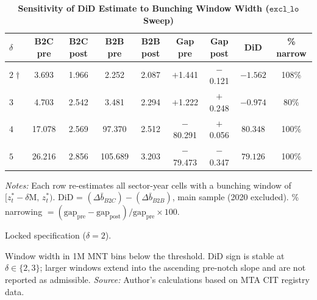 \documentclass[12pt,oneside,a4paper]{report}
\begin{document}
\begin{table}[H]
\centering
\caption{\textbf{Sensitivity of DiD Estimate to Bunching Window Width ($\texttt{excl\_lo}$ Sweep)}}
\label{tab:app_excl_lo}
\begin{threeparttable}
\setlength{\tabcolsep}{4pt} %
\small
\begin{tabular}{lcccccccc}
\toprule
$\delta$\tnote{a} & B2C pre & B2C post & B2B pre & B2B post
  & Gap pre & Gap post & DiD & \% narrow \\
\midrule
$2\dag$ & 3.693 & 1.966 & 2.252 & 2.087 & $+$1.441 & $-$0.121 & $-1.562$ & 108\% \\
$3$ & 4.703 & 2.542 & 3.481 & 2.294 & $+$1.222 & $+$0.248 & $-0.974$ & 80\% \\
$4$ & 17.078 & 2.569 & 97.370 & 2.512 & $-$80.291 & $+$0.056 & $80.348$ & 100\% \\
$5$ & 26.216 & 2.856 & 105.689 & 3.203 & $-$79.473 & $-$0.347 & $79.126$ & 100\% \\
\bottomrule
\end{tabular}
\begin{tablenotes}\footnotesize
\item \textit{Notes:} Each row re-estimates all sector-year cells with a bunching window of $[z^*_t - \delta\text{M},\, z^*_t)$. DiD = $(\Delta\bar{b}_{B2C}) - (\Delta\bar{b}_{B2B})$, main sample (2020 excluded). \% narrowing $= (\text{gap}_{\text{pre}} - \text{gap}_{\text{post}}) / \text{gap}_{\text{pre}} \times 100$.
\item[$\dag$] Locked specification ($\delta = 2$).
\item[a] Window width in 1M MNT bins below the threshold.
DiD sign is stable at $\delta \in \{2,3\}$; larger windows
extend into the ascending pre-notch slope and are not reported as admissible.
\textit{Source:} Author's calculations based on MTA CIT registry data.
\end{tablenotes}
\end{threeparttable}
\end{table}


\printbibliography
\end{document}
